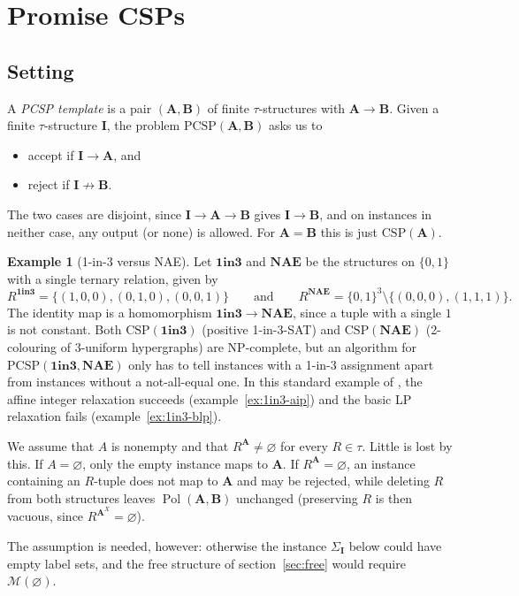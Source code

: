 \documentclass[11pt]{article}
\theoremstyle{plain}
\theoremstyle{definition}
\newtheorem{example}[theorem]{Example}
\newcommand{\Pol}{\operatorname{Pol}}
\newcommand{\bA}{\mathbf{A}}
\newcommand{\bB}{\mathbf{B}}
\newcommand{\bI}{\mathbf{I}}
\newcommand{\M}{\mathscr{M}}
\newcommand{\OIT}{\mathbf{1in3}}
\newcommand{\NAE}{\mathbf{NAE}}
\newcommand{\PCSP}{\mathrm{PCSP}}
\newcommand{\CSP}{\mathrm{CSP}}
\begin{document}
\section{Promise CSPs}\label{sec:pcsp}

\subsection{Setting}\label{sec:setting}

A \emph{PCSP template} is a pair $(\bA,\bB)$ of finite $\tau$-structures with $\bA\to\bB$. Given a finite $\tau$-structure $\bI$, the problem $\PCSP(\bA,\bB)$ asks us to
\begin{itemize}
  \item accept if $\bI\to\bA$, and
  \item reject if $\bI\not\to\bB$.
\end{itemize}
The two cases are disjoint, since $\bI\to\bA\to\bB$ gives $\bI\to\bB$, and on instances in neither case, any output (or none) is allowed. For $\bA=\bB$ this is just $\CSP(\bA)$.

\begin{example}[1-in-3 versus NAE]\label{ex:1in3}
Let $\OIT$ and $\NAE$ be the structures on $\{0,1\}$ with a single ternary relation, given by
\[
R^{\OIT}=\{(1,0,0),(0,1,0),(0,0,1)\}\qquad\text{and}\qquad R^{\NAE}=\{0,1\}^3\setminus\{(0,0,0),(1,1,1)\}.
\]
The identity map is a homomorphism $\OIT\to\NAE$, since a tuple with a single $1$ is not constant. Both $\CSP(\OIT)$ (positive 1-in-3-SAT) and $\CSP(\NAE)$ (2-colouring of $3$-uniform hypergraphs) are NP-complete, but an algorithm for $\PCSP(\OIT,\NAE)$ only has to tell instances with a 1-in-3 assignment apart from instances without a not-all-equal one. In this standard example of \cite{BBKO}, the affine integer relaxation succeeds (example~\ref{ex:1in3-aip}) and the basic LP relaxation fails (example~\ref{ex:1in3-blp}).
\end{example}

We assume that $A$ is nonempty and that $R^{\bA}\neq\varnothing$ for every $R\in\tau$. Little is lost by this. If $A=\varnothing$, only the empty instance maps to $\bA$. If $R^{\bA}=\varnothing$, an instance containing an $R$-tuple does not map to $\bA$ and may be rejected, while deleting $R$ from both structures leaves $\Pol(\bA,\bB)$ unchanged (preserving $R$ is then vacuous, since $R^{\bA^X}=\varnothing$).

The assumption is needed, however: otherwise the instance $\Sigma_{\bI}$ below could have empty label sets, and the free structure of section~\ref{sec:free} would require $\M(\varnothing)$.
\end{document}
